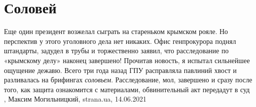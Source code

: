  
 
 
 
 
\chapter{Соловей}

Еще один президент возжелал сыграть на стареньком крымском рояле. Но
перспектив у этого уголовного дела нет никаких. Офис генпрокурора поднял
штандарты, задудел в трубы и торжественно заявил, что расследование по
«крымскому делу» наконец завершено! Прочитав новость, я испытал сильнейшее
ощущение дежавю. Всего три года назад ГПУ расправляла павлиний хвост и
разливалась на брифингах \emph{соловьем}. Расследование, мол, завершено и сразу
после того, как защита ознакомится с материалами, обвинительный акт передадут в
суд
, 
Максим Могильницкий, strana.ua, 14.06.2021

